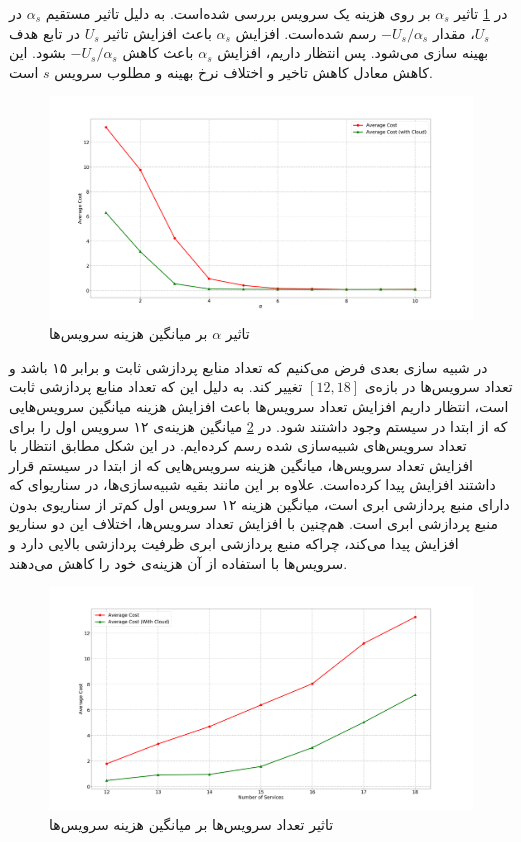     در \cref{fig:many_to_many:sim8} تاثیر $\alpha_s$ بر روی هزینه یک سرویس بررسی شده‌است.
    به دلیل تاثیر مستقیم $\alpha_s$ در $U_s$، مقدار $-U_s/\alpha_s$ رسم شده‌است.
    افزایش $\alpha_s$ باعث افزایش تاثیر $U_s$ در تابع هدف بهینه سازی می‌شود.
    پس انتظار داریم، افزایش $\alpha_s$ باعث کاهش $-U_s/\alpha_s$ بشود.
    این کاهش معادل کاهش تاخیر و اختلاف نرخ بهینه و مطلوب سرویس $s$ است.

    \begin{figure}[]
      \centerline{\includegraphics[width=17cm]{graphics/many_to_many/sim_8}}
      \caption{تاثیر $\alpha$ بر میانگین هزینه سرویس‌ها}
      \label{fig:many_to_many:sim8}
    \end{figure}

    در شبیه سازی بعدی فرض می‌کنیم که تعداد منابع پردازشی ثابت و برابر ۱۵ باشد و تعداد سرویس‌ها در بازه‌ی $[12,18]$ تغییر کند.
    به دلیل این که تعداد منابع پردازشی ثابت است، انتظار داریم افزایش تعداد سرویس‌ها باعث افزایش هزینه میانگین سرویس‌هایی که از ابتدا در سیستم وجود داشتند شود.
    در \cref{fig:many_to_many:sim9} میانگین هزینه‌ی ۱۲ سرویس اول را برای تعداد سرویس‌های شبیه‌سازی شده رسم کرده‌ایم.
    در این شکل مطابق انتظار با افزایش تعداد سرویس‌ها، میانگین هزینه سرویس‌هایی که از ابتدا در سیستم قرار داشتند افزایش پیدا کرده‌است.
    علاوه بر این مانند بقیه شبیه‌سازی‌ها، در سناریو‌ای که دارای منبع پردازشی ابری است، میانگین هزینه ۱۲ سرویس اول کم‌تر از سناریو‌ی بدون منبع پردازشی ابری است.
    هم‌چنین با افزایش تعداد سرویس‌ها، اختلاف این دو سناریو افزایش پیدا می‌کند، چراکه منبع پردازشی ابری ظرفیت پردازشی بالایی دارد و سرویس‌ها با استفاده از آن هزینه‌ی خود را کاهش می‌دهند.

    \begin{figure}[]
      \centerline{\includegraphics[width=17cm]{graphics/many_to_many/sim_9}}
      \caption{تاثیر تعداد سرویس‌ها بر میانگین هزینه سرویس‌ها}
      \label{fig:many_to_many:sim9}
    \end{figure}

